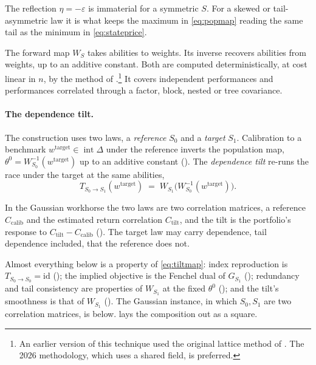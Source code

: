 The reflection $\eta = -\varepsilon$ is
immaterial for a symmetric $S$.
For a skewed or tail-asymmetric law it is what
keeps the maximum in \eqref{eq:popmap} reading the same tail as the minimum in
\eqref{eq:stateprice}.

The forward map $W_S$ takes abilities to weights. Its inverse recovers abilities
from weights, up to an additive constant. Both are computed deterministically, at
cost linear in $n$, by the method of \textcite{cotton2026inversion}.\footnote{An earlier version of this
technique used the original lattice method of \textcite{cotton2021}. The 2026
methodology, which uses a shared field, is preferred.} It covers independent
performances and performances correlated through a factor, block, nested or tree
covariance.

\paragraph{The dependence tilt.}
The construction uses two laws, a \emph{reference} $S_0$ and a \emph{target} $S_1$.
Calibration to a benchmark $w^{\mathrm{target}}\in\operatorname{int}\Delta$ under
the reference inverts the population map,
$\theta^0 = W_{S_0}^{-1}(w^{\mathrm{target}})$ up to an additive constant
(). The \emph{dependence tilt} re-runs the race under the target at
the same abilities,
\begin{equation}
  T_{S_0\to S_1}(w^{\mathrm{target}}) \;=\; W_{S_1}\!\big(W_{S_0}^{-1}(w^{\mathrm{target}})\big).
  \label{eq:tiltmap}
\end{equation}

In the Gaussian workhorse the two laws are two correlation matrices, a reference
$C_{\mathrm{calib}}$ and the estimated return correlation $C_{\mathrm{tilt}}$, and
the tilt is the portfolio's response to $C_{\mathrm{tilt}} - C_{\mathrm{calib}}$
(). The target law may carry dependence, tail dependence
included, that the reference does not.

Almost everything below is a property of \eqref{eq:tiltmap}: index reproduction is
$T_{S_0\to S_0} = \mathrm{id}$ (); the implied objective is
the Fenchel dual of $G_{S_1}$ (); redundancy and tail
consistency are properties of $W_{S_1}$ at the fixed $\theta^0$
(); and the tilt's smoothness is that of $W_{S_1}$
(). The Gaussian instance, in which $S_0, S_1$ are two correlation
matrices, is  below.  lays the composition out as a
square.


